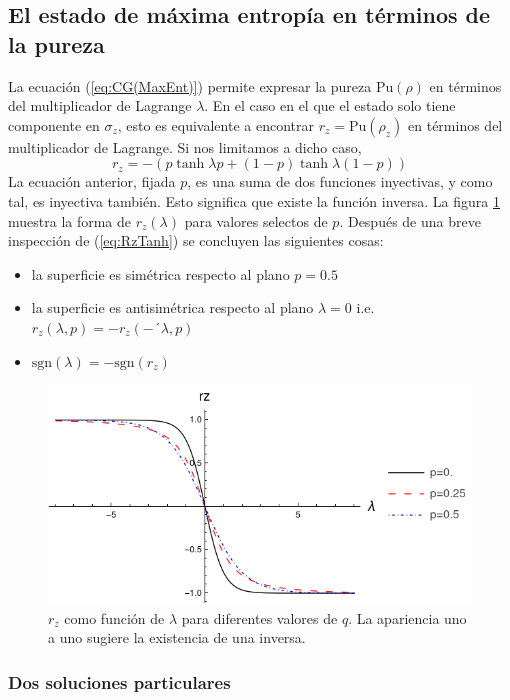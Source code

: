 \subsection{El estado de máxima entropía en términos de la pureza}

La ecuación (\ref{eq:CG(MaxEnt)}) permite expresar la pureza $\text{Pu}(\rho)$ en términos del multiplicador de Lagrange $\lambda$. En el caso en el que el estado solo tiene componente en $\sigma_{z}$, esto es equivalente a encontrar $r_{z}=\text{Pu}(\rho_{z})$ en términos del multiplicador de Lagrange. Si nos limitamos a dicho caso,
\begin{equation}\label{eq:RzTanh}
    \boxed{r_{z}=-(p\tanh{\lambda p}+(1-p)\tanh{\lambda (1-p)})}  
\end{equation}
La ecuación anterior, fijada $p$, es una suma de dos funciones inyectivas, y como tal, es inyectiva también. Esto significa que existe la función inversa. La figura \ref{fig:rzinv} muestra la forma de $r_{z}(\lambda)$ para valores selectos de $p$. Después de una breve inspección de (\ref{eq:RzTanh}) se concluyen las siguientes cosas:
\begin{itemize}
\item la superficie es simétrica respecto al plano $p=0.5$
\item la superficie es antisimétrica  respecto al plano $\lambda=0$ i.e. $r_{z}(\lambda,p)=-r_{z}(-´\lambda,p)$
\item $\text{sgn}(\lambda)=-\text{sgn}(r_{z})$
\end{itemize}
\begin{figure}[h!]
\centering
\includegraphics[width=0.6\linewidth]{maxent/figures/rz(lambda)_lambda-8to8.png}
\caption{$r_{z}$ como función de $\lambda$ para diferentes valores de $q$. La apariencia uno a uno sugiere la existencia de una inversa.}
\label{fig:rzinv}
\end{figure}

\subsubsection{Dos soluciones particulares}

